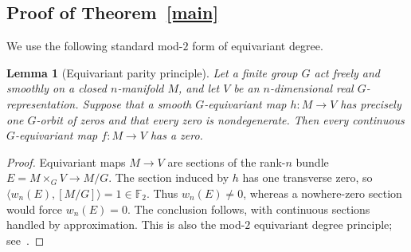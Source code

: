 \documentclass[10pt,a4paper]{amsart}
\newtheorem{lemma}[thm]{Lemma}
\begin{document}
\subsection{Proof of Theorem~\ref{main}}\label{sec:proof-main}

We use the following standard mod-$2$ form of equivariant degree.

\begin{lemma}[Equivariant parity principle]\label{lem:degree}
Let a finite group $G$ act freely and smoothly on a closed
$n$-manifold $M$, and let $V$ be an $n$-dimensional real
$G$-representation.  Suppose that a smooth $G$-equivariant map
$h:M\to V$ has precisely one $G$-orbit of zeros and that every zero
is nondegenerate.  Then every continuous $G$-equivariant map
$f:M\to V$ has a zero.
\end{lemma}

\begin{proof}
Equivariant maps $M\to V$ are sections of the rank-$n$ bundle
$E=M\times_GV\to M/G$.  The section induced by $h$ has one transverse
zero, so
$\langle w_n(E),[M/G]\rangle=1\in\mathbb F_2$.
Thus $w_n(E)\ne0$, whereas a nowhere-zero section would force
$w_n(E)=0$.  The conclusion follows, with continuous sections handled
by approximation.  This is also the mod-$2$ equivariant degree
principle; see~\cite[Theorem~1]{Mus12}.
\end{proof}
\end{document}
